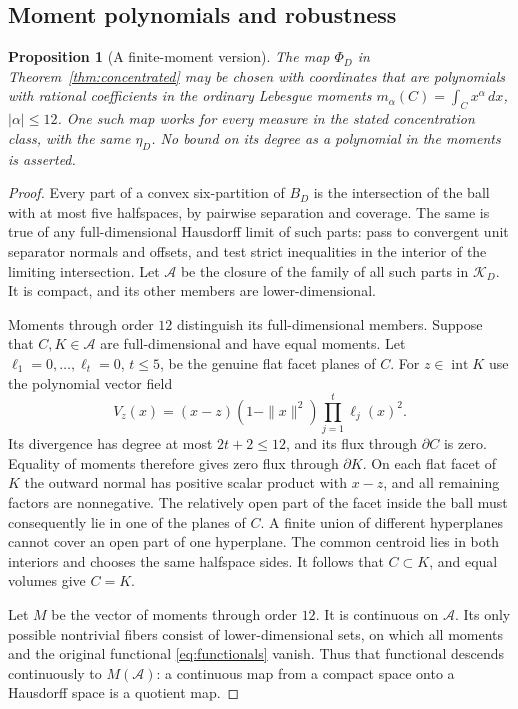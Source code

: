 \documentclass[a4paper,11pt,reqno]{amsart}
\newcommand{\dd}{\,d}
\newcommand{\intt}{\operatorname{int}}
\newtheorem{proposition}[theorem]{Proposition}
\theoremstyle{definition}
\theoremstyle{remark}
\numberwithin{equation}{section}
\begin{document}
\subsection{Moment polynomials and robustness}
\begin{proposition}[A finite-moment version]\label{prop:moments}
The map $\Phi_D$ in Theorem~\ref{thm:concentrated} may be chosen with coordinates
that are polynomials with rational coefficients in the ordinary
Lebesgue moments $m_\alpha(C)=\int_Cx^\alpha\dd x$, $|\alpha|\le12$.
One such map works for every measure in the stated concentration
class, with the same $\eta_D$. No bound on its degree as a polynomial
in the moments is asserted.
\end{proposition}
\begin{proof}
Every part of a convex six-partition of $B_D$ is the intersection
of the ball with at most five halfspaces, by pairwise separation
and coverage. The same is true of any full-dimensional Hausdorff
limit of such parts: pass to convergent unit separator normals and
offsets, and test strict inequalities in the interior of the
limiting intersection. Let $\mathcal A$ be the closure of the family
of all such parts in $\mathcal K_D$. It is compact, and its other
members are lower-dimensional.

Moments through order $12$ distinguish its full-dimensional members.
Suppose that $C,K\in\mathcal A$ are full-dimensional and have equal
moments. Let $\ell_1=0,\ldots,\ell_t=0$, $t\le5$, be the genuine
flat facet planes of $C$. For $z\in\intt K$ use the polynomial
vector field
\[
 V_z(x)=(x-z)(1-\|x\|^2)\prod_{j=1}^t\ell_j(x)^2.
\]
Its divergence has degree at most $2t+2\le12$, and its flux through
$\partial C$ is zero. Equality of moments therefore gives zero
flux through $\partial K$. On each flat facet of $K$ the outward
normal has positive scalar product with $x-z$, and all remaining
factors are nonnegative. The relatively open part of the facet
inside the ball must consequently lie in one of the planes of $C$.
A finite union of different hyperplanes cannot cover an open part
of one hyperplane. The common centroid lies in both interiors and
chooses the same halfspace sides. It follows that $C\subset K$,
and equal volumes give $C=K$.

Let $M$ be the vector of moments through order $12$. It is continuous
on $\mathcal A$. Its only possible nontrivial fibers consist of
lower-dimensional sets, on which all moments and the original
functional \eqref{eq:functionals} vanish. Thus that functional
descends continuously to $M(\mathcal A)$: a continuous map from a
compact space onto a Hausdorff space is a quotient map.


\end{proof}
\end{document}
